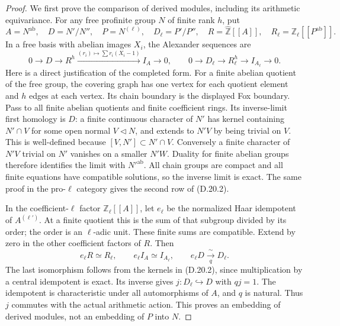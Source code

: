 \begin{proof}
We first prove the comparison of derived modules, including
its arithmetic equivariance. For any free profinite group
\(N\) of finite rank \(h\), put
\[
 A=N^{\mathrm{ab}},\quad D=N'/N'',\quad
 P=N^{(\ell)},\quad D_\ell=P'/P'',\quad
 R=\widehat{\mathbb Z}[[A]],\quad
 R_\ell=\mathbb Z_\ell[[P^{\mathrm{ab}}]].
\]
In a free basis with abelian images \(X_i\), the Alexander
sequences are
\[
 0\longrightarrow D\longrightarrow R^h
   \xrightarrow{(r_i)\mapsto\sum r_i(X_i-1)}I_A
   \longrightarrow0,\qquad
 0\longrightarrow D_\ell\longrightarrow R_\ell^h
   \longrightarrow I_{A_\ell}\longrightarrow0.       \tag{D.20.2}
\]
Here is a direct justification of the completed form.
For a finite abelian quotient of the free group, the
covering graph has one vertex for each quotient element
and \(h\) edges at each vertex. Its chain boundary is
the displayed Fox boundary. Pass to all finite abelian
quotients and finite coefficient rings. Its inverse-limit
first homology is \(D\): a finite continuous character
of \(N'\) has kernel containing \(N'\cap V\) for some
open normal \(V\lhd N\), and extends to \(N'V\) by
being trivial on \(V\). This is well-defined because
\([V,N']\subset N'\cap V\). Conversely a finite character
of \(N'V\) trivial on \(N'\) vanishes on a smaller
\(N'W\). Duality for finite abelian groups therefore
identifies the limit with \(N'^{\mathrm{ab}}\).
All chain groups are compact and all finite equations
have compatible solutions, so the inverse limit is exact.
The same proof in the pro-\(\ell\) category gives the
second row of (D.20.2).

In the coefficient-\(\ell\) factor \(\mathbb Z_\ell[[A]]\),
let \(e_\ell\) be the normalized Haar idempotent of
\(A^{(\ell')}\). At a finite quotient this is the
sum of that subgroup divided by its order; the order
is an \(\ell\)-adic unit. These finite sums are compatible.
Extend by zero in the other coefficient factors of \(R\).
Then
\[
 e_\ell R\simeq R_\ell,\qquad
 e_\ell I_A\simeq I_{A_\ell},\qquad
 e_\ell D\xrightarrow[\ q\ ]{\ \sim\ }D_\ell.       \tag{D.20.3}
\]
The last isomorphism follows from the kernels in
(D.20.2), since multiplication by a central idempotent
is exact. Its inverse gives
\(j:D_\ell\hookrightarrow D\) with \(qj=1\).
The idempotent is characteristic under all automorphisms
of \(A\), and \(q\) is natural. Thus \(j\) commutes
with the actual arithmetic action. This proves an
embedding of derived modules, not an embedding of
\(P\) into \(N\).


\end{proof}
